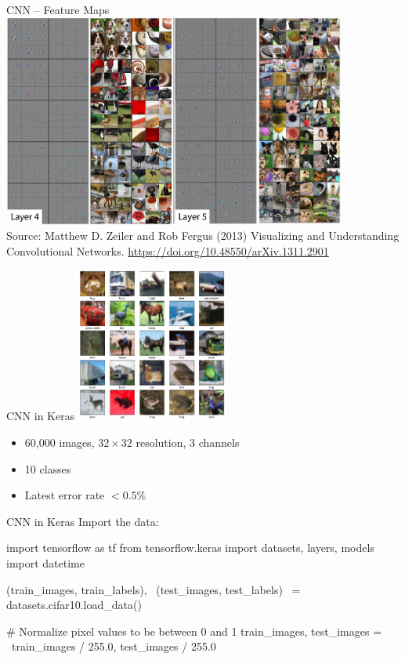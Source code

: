 \documentclass[ignorenonframetext,xcolor=x11names]{beamer}
\begin{document}
\begin{frame}{CNN -- Feature Maps}
\centering
\includegraphics[height=2.75in]{layers45.png} \\
\vspace{0.5\baselineskip}
\scriptsize Source: Matthew D. Zeiler and Rob Fergus (2013) Visualizing and Understanding Convolutional Networks. \url{https://doi.org/10.48550/arXiv.1311.2901}
\end{frame}

\begin{frame}{CNN in Keras}
\centering
\includegraphics[height=2in]{cifar10.png}
\begin{itemize}
   \item 60,000 images, $32 \times 32$ resolution, 3 channels
   \item 10 classes
   \item Latest error rate $< 0.5\%$
\end{itemize}
\end{frame}

\begin{frame}[fragile]{CNN in Keras}
Import the data:
\begin{pythoncode}
import tensorflow as tf
from tensorflow.keras import datasets, layers, models
import datetime

(train_images, train_labels), \
(test_images, test_labels) \
    = datasets.cifar10.load_data()

# Normalize pixel values to be between 0 and 1
train_images, test_images = \
train_images / 255.0, test_images / 255.0
\end{pythoncode}
\end{frame}
\end{document}
